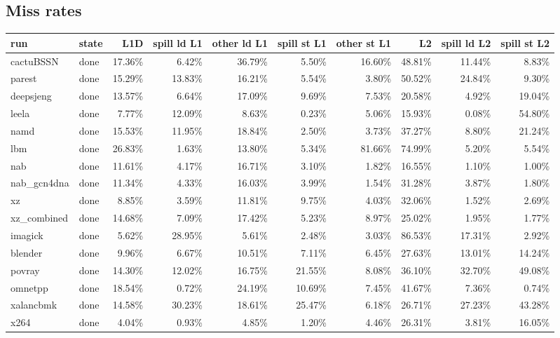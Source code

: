 \documentclass[10pt,a4paper,landscape]{article}
\begin{document}
\subsection*{Miss rates}
{\footnotesize
\begin{longtable}{llrrrrrrrr}
\toprule
run & state & L1D & spill ld L1 & other ld L1 & spill st L1 & other st L1 & L2 & spill ld L2 & spill st L2 \\
\midrule
\endhead
\bottomrule
\endfoot
cactuBSSN & done & 17.36\% & 6.42\% & 36.79\% & 5.50\% & 16.60\% & 48.81\% & 11.44\% & 8.83\% \\
parest & done & 15.29\% & 13.83\% & 16.21\% & 5.54\% & 3.80\% & 50.52\% & 24.84\% & 9.30\% \\
deepsjeng & done & 13.57\% & 6.64\% & 17.09\% & 9.69\% & 7.53\% & 20.58\% & 4.92\% & 19.04\% \\
leela & done & 7.77\% & 12.09\% & 8.63\% & 0.23\% & 5.06\% & 15.93\% & 0.08\% & 54.80\% \\
namd & done & 15.53\% & 11.95\% & 18.84\% & 2.50\% & 3.73\% & 37.27\% & 8.80\% & 21.24\% \\
lbm & done & 26.83\% & 1.63\% & 13.80\% & 5.34\% & 81.66\% & 74.99\% & 5.20\% & 5.54\% \\
nab & done & 11.61\% & 4.17\% & 16.71\% & 3.10\% & 1.82\% & 16.55\% & 1.10\% & 1.00\% \\
nab\_gcn4dna & done & 11.34\% & 4.33\% & 16.03\% & 3.99\% & 1.54\% & 31.28\% & 3.87\% & 1.80\% \\
xz & done & 8.85\% & 3.59\% & 11.81\% & 9.75\% & 4.03\% & 32.06\% & 1.52\% & 2.69\% \\
xz\_combined & done & 14.68\% & 7.09\% & 17.42\% & 5.23\% & 8.97\% & 25.02\% & 1.95\% & 1.77\% \\
imagick & done & 5.62\% & 28.95\% & 5.61\% & 2.48\% & 3.03\% & 86.53\% & 17.31\% & 2.92\% \\
blender & done & 9.96\% & 6.67\% & 10.51\% & 7.11\% & 6.45\% & 27.63\% & 13.01\% & 14.24\% \\
povray & done & 14.30\% & 12.02\% & 16.75\% & 21.55\% & 8.08\% & 36.10\% & 32.70\% & 49.08\% \\
omnetpp & done & 18.54\% & 0.72\% & 24.19\% & 10.69\% & 7.45\% & 41.67\% & 7.36\% & 0.74\% \\
xalancbmk & done & 14.58\% & 30.23\% & 18.61\% & 25.47\% & 6.18\% & 26.71\% & 27.23\% & 43.28\% \\
x264 & done & 4.04\% & 0.93\% & 4.85\% & 1.20\% & 4.46\% & 26.31\% & 3.81\% & 16.05\% \\

\end{longtable}}
\end{document}
